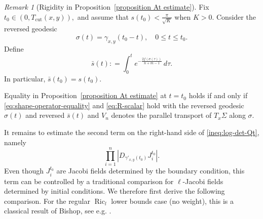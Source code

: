 \documentclass[psamsfonts]{amsart}
\theoremstyle{definition}
\theoremstyle{remark}
\newtheorem{rem}[thm]{Remark}
\DeclareMathOperator{\Ric}{Ric}
\numberwithin{equation}{section}
\begin{document}
\begin{rem}[Rigidity in Proposition~\ref{proposition At estimate}]\label{remark-rigidity-prop1-10}
Fix $t_0 \in (0,T_{\mathrm{cut}}(x,y)),$ and assume that 
$s(t_0)<\frac{\pi}{\sqrt K}$ when $K >0$. 
Consider the reversed geodesic 
$$\sigma (t) = \gamma_{x,y}(t_0 - t), \quad 0 \leq t \leq t_0.$$
Define
$$\bar s(t) : = \int_0^t e^{-\frac{2f(\sigma(\tau))}{n+m-1}}\,d\tau.$$
In particular, $\bar s (t_0) = s(t_0).$

Equality in Proposition~\ref{proposition At estimate} at $t = t_0$ holds if and only if \eqref{eq:shape-operator-equality} and \eqref{eq:R-scalar} hold with the reversed geodesic $\sigma(t)$ and reversed $\bar  s(t)$ and $V_n$ denotes the parallel transport of $T_x\Sigma$ along $\sigma$.

\end{rem}

It remains to estimate the second term on the right-hand side of \eqref{ineq:log-det-Qt}, namely
$$ \prod_{i=1}^n \left| D_{\gamma'_{x,y}(t_0)} J_i^{t_0} \right|.$$ Even though $J_i^{t_0}$ are Jacobi fields determined by the boundary condition, 
this term can be controlled by a traditional comparison for $\ell$-Jacobi fields determined by initial conditions. We therefore first derive  the following comparison. For the regular $\Ric_l$ lower bounds case (no weight), this is a classical result of Bishop, see e.g. \cite[Lemma 3.6]{Pan-Yi2026}.
\end{document}
